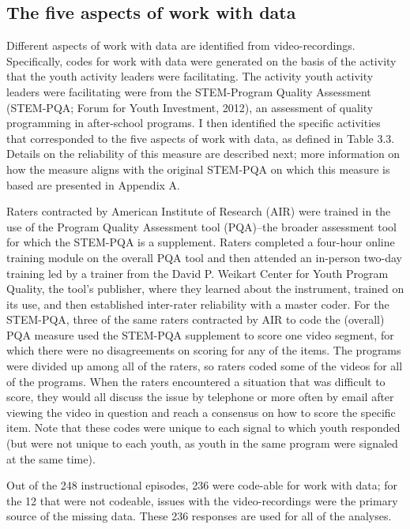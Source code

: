 \documentclass[]{msu-thesis}
\theoremstyle{definition}
\theoremstyle{definition}
\theoremstyle{definition}
\theoremstyle{remark}
\begin{document}
\subsection{The five aspects of work with
data}\label{the-five-aspects-of-work-with-data}

Different aspects of work with data are identified from
video-recordings. Specifically, codes for work with data were generated
on the basis of the activity that the youth activity leaders were
facilitating. The activity youth activity leaders were facilitating were
from the STEM-Program Quality Assessment (STEM-PQA; Forum for Youth
Investment, 2012), an assessment of quality programming in after-school
programs. I then identified the specific activities that corresponded to
the five aspects of work with data, as defined in Table 3.3. Details on
the reliability of this measure are described next; more information on
how the measure aligns with the original STEM-PQA on which this measure
is based are presented in Appendix A.

Raters contracted by American Institute of Research (AIR) were trained
in the use of the Program Quality Assessment tool (PQA)--the broader
assessment tool for which the STEM-PQA is a supplement. Raters completed
a four-hour online training module on the overall PQA tool and then
attended an in-person two-day training led by a trainer from the David
P. Weikart Center for Youth Program Quality, the tool's publisher, where
they learned about the instrument, trained on its use, and then
established inter-rater reliability with a master coder. For the
STEM-PQA, three of the same raters contracted by AIR to code the
(overall) PQA measure used the STEM-PQA supplement to score one video
segment, for which there were no disagreements on scoring for any of the
items. The programs were divided up among all of the raters, so raters
coded some of the videos for all of the programs. When the raters
encountered a situation that was difficult to score, they would all
discuss the issue by telephone or more often by email after viewing the
video in question and reach a consensus on how to score the specific
item. Note that these codes were unique to each signal to which youth
responded (but were not unique to each youth, as youth in the same
program were signaled at the same time).

Out of the 248 instructional episodes, 236 were code-able for work with
data; for the 12 that were not codeable, issues with the
video-recordings were the primary source of the missing data. These 236
responses are used for all of the analyses.
\end{document}
